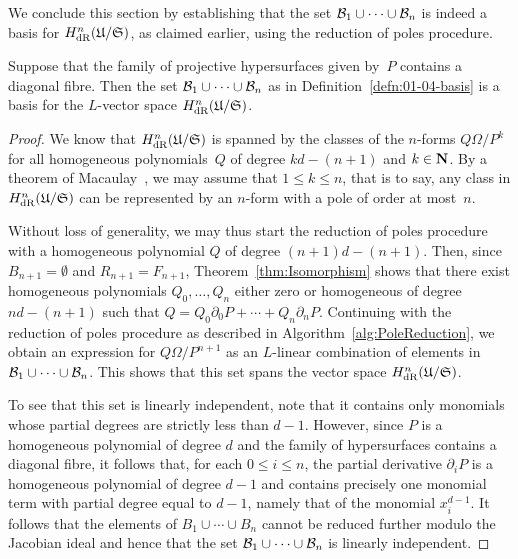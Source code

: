 We conclude this section by establishing that the set 
$\mathcal{B}_1 \cup \dotsb \cup \mathcal{B}_n$ is indeed a basis for 
$H_{\text{dR}}^n(\mathfrak{U}/\mathfrak{S})$, as claimed earlier, 
using the reduction of poles procedure.

\begin{thm} \label{thm:Basis}
Suppose that the family of projective hypersurfaces given by~$P$ contains 
a diagonal fibre.  Then the set $\mathcal{B}_1 \cup \dotsb \cup \mathcal{B}_n$ as in 
Definition~\ref{defn:01-04-basis} is a basis for the $L$-vector space 
$H_{\text{dR}}^n(\mathfrak{U}/\mathfrak{S})$.
\end{thm}

\begin{proof}
We know that $H_{\text{dR}}^n(\mathfrak{U}/\mathfrak{S})$ is spanned 
by the classes of the $n$-forms $Q \Omega / P^k$ for all 
homogeneous polynomials~$Q$ of degree $kd-(n+1)$ and $k \in \mathbf{N}$.  
By a theorem of Macaulay~\citep[\S 4, (4.11)]{Griffiths1969}, 
we may assume that $1 \leq k \leq n$, that is to say, any class in 
$H_{\text{dR}}^n(\mathfrak{U}/\mathfrak{S})$ can be represented by an 
$n$-form with a pole of order at most~$n$.

Without loss of generality, we may thus start the reduction of poles 
procedure with a homogeneous polynomial $Q$ of degree $(n+1)d-(n+1)$.  Then, 
since $B_{n+1} = \emptyset$ and $R_{n+1} = F_{n+1}$, 
Theorem~\ref{thm:Isomorphism} shows that there exist homogeneous polynomials 
$Q_0, \dotsc, Q_n$ either zero or homogeneous of degree $nd-(n+1)$ such that 
$Q = Q_0 \partial_0 P + \dotsb + Q_n \partial_n P$.  Continuing with the 
reduction of poles procedure as described in 
Algorithm~\ref{alg:PoleReduction}, we obtain an expression for 
$Q \Omega / P^{n+1}$ as an $L$-linear combination of elements in 
$\mathcal{B}_1 \cup \dotsb \cup \mathcal{B}_n$.  This shows that this set spans the vector 
space $H_{\text{dR}}^n(\mathfrak{U}/\mathfrak{S})$.

To see that this set is linearly independent, note that it contains only 
monomials whose partial degrees are strictly less than $d-1$.  However, since 
$P$ is a homogeneous polynomial of degree $d$ and the family of hypersurfaces 
contains a diagonal fibre, it follows that, for each $0 \leq i \leq n$, the 
partial derivative $\partial_i P$ is a homogeneous polynomial of degree $d-1$ 
and contains precisely one monomial term with partial degree equal to $d-1$, 
namely that of the monomial $x_i^{d-1}$.  It follows that the elements of 
$B_1 \cup \dotsb \cup B_n$ cannot be reduced further modulo the Jacobian 
ideal and hence that the set $\mathcal{B}_1 \cup \dotsb \cup \mathcal{B}_n$ is linearly 
independent.
\end{proof}

